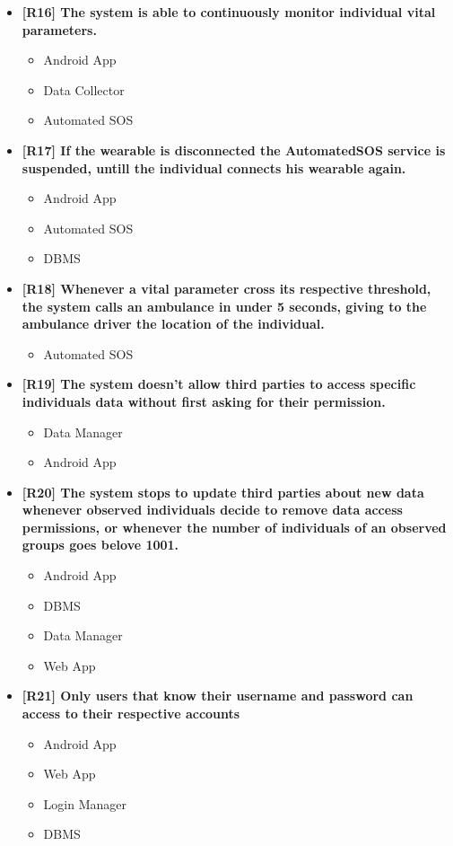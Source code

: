 \begin{itemize}
\item \textbf{[R16] The system is able to continuously monitor individual vital parameters.}
\begin{itemize}
\item Android App
\item Data Collector
\item Automated SOS
\end{itemize}

\item \textbf{[R17] If the wearable is disconnected the AutomatedSOS service is suspended, untill the individual connects his wearable again.}
\begin{itemize}
\item Android App
\item Automated SOS
\item DBMS
\end{itemize}

\item \textbf{[R18] Whenever a vital parameter cross its respective threshold, the system calls an ambulance in under 5 seconds, giving to the ambulance driver the location of the individual.}
\begin{itemize}
\item Automated SOS
\end{itemize}

\item \textbf{[R19] The system doesn’t allow third parties to access specific individuals data without first asking for their permission.}
\begin{itemize}
\item Data Manager
\item Android App
\end{itemize}

\item \textbf{[R20] The system stops to update third parties about new data whenever observed individuals decide to remove data access permissions, or whenever the number of individuals of an observed groups goes belove 1001.}
\begin{itemize}
\item Android App
\item DBMS
\item Data Manager
\item Web App
\end{itemize}


\item \textbf{[R21] Only users that know their username and password can access to their respective accounts}
\begin{itemize}
\item Android App
\item Web App
\item Login Manager
\item DBMS
\end{itemize}
\end{itemize}



